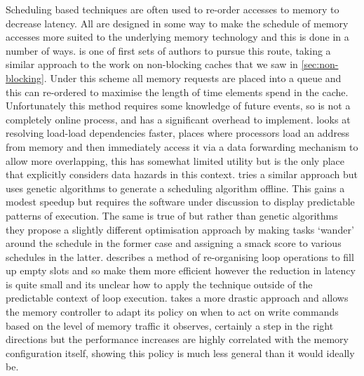 Scheduling based techniques are often used to re-order accesses to memory to decrease latency. All are designed in some way to make the schedule of memory accesses more suited to the underlying memory technology and this is done in a number of ways. \citet{kiniwaLookaheadSchedulingRequests1998} is one of first sets of authors to pursue this route, taking a similar approach to the work on non-blocking caches that we saw in \ref{sec:non-blocking}. Under this scheme all memory requests are placed into a queue and this can re-ordered to maximise the length of time elements spend in the cache. Unfortunately this method requires some knowledge of future events, so is not a completely online process, and has a significant overhead to implement. \citet{yangOverlappingDependentLoads2006} looks at resolving load-load dependencies faster, places where processors load an address from memory and then immediately access it via a data forwarding mechanism to allow more overlapping, this has somewhat limited utility but is the only place that explicitly considers data hazards in this context. \citet{luoDesignRealizationOptimized2010} tries a similar approach but uses genetic algorithms to generate a scheduling algorithm offline. This gains a modest speedup but requires the software under discussion to display predictable patterns of execution. The same is true of \citet{wei-chetsengOptimalSchedulingMinimize2010, kegleyPredictiveCacheModeling2011} but rather than genetic algorithms they propose a slightly different optimisation approach by making tasks `wander' around the schedule in the former case and assigning a \gls{smack} score to various schedules in the latter. \citet{qaziOptimizationAccessLatency2016} describes a method of re-organising loop operations to fill up empty slots and so make them more efficient however the reduction in latency is quite small and its unclear how to apply the technique outside of the predictable context of loop execution. \citet{modgilImprovingPerformanceChip2018} takes a more drastic approach and allows the memory controller to adapt its policy on when to act on write commands based on the level of memory traffic it observes, certainly a step in the right directions but the performance increases are highly correlated with the memory configuration itself, showing this policy is much less general than it would ideally be.

